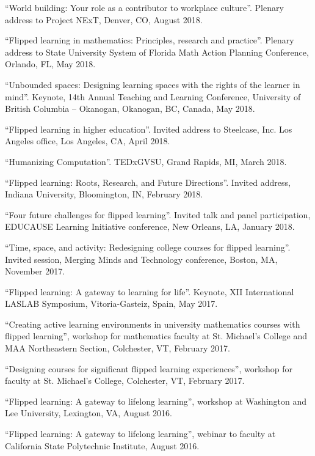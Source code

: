 \documentclass[letterpaper]{article}
\renewenvironment{itemize}{
  \begin{list}{}{
    \setlength{\leftmargin}{1.5em}
	\setlength{\itemsep}{0in}
  }
}{
  \end{list}
}
\begin{document}
\begin{itemize}
   \item ``World building: Your role as a contributor to workplace culture''. Plenary address to Project NExT, Denver, CO, August 2018. 
   \item ``Flipped learning in mathematics: Principles, research and practice''. Plenary address to State University System of Florida Math Action Planning Conference, Orlando, FL, May 2018. 
   \item ``Unbounded spaces: Designing learning spaces with the rights of the learner in mind''. Keynote, 14th Annual Teaching and Learning Conference, University of British Columbia -- Okanogan, Okanogan, BC, Canada, May 2018. 
   \item ``Flipped learning in higher education''. Invited address to Steelcase, Inc. Los Angeles office, Los Angeles, CA, April 2018. 
   \item ``Humanizing Computation''. TEDxGVSU, Grand Rapids, MI, March 2018. 
   \item ``Flipped learning: Roots, Research, and Future Directions''. Invited address, Indiana University, Bloomington, IN, February 2018. 
   \item ``Four future challenges for flipped learning''. Invited talk and panel participation, EDUCAUSE Learning Initiative conference, New Orleans, LA, January 2018. 
   \item ``Time, space, and activity: Redesigning college courses for flipped learning''. Invited session, Merging Minds and Technology conference, Boston, MA, November 2017. 
   \item ``Flipped learning: A gateway to learning for life''. Keynote, XII International LASLAB Symposium, Vitoria-Gasteiz, Spain, May 2017. 
  \item ``Creating active learning environments in university mathematics courses with flipped learning'', workshop for mathematics faculty at St. Michael's College and MAA Northeastern Section, Colchester, VT, February 2017.
  \item ``Designing courses for significant flipped learning experiences'', workshop for faculty at St. Michael's College, Colchester, VT, February 2017.
  	\item ``Flipped learning: A gateway to lifelong learning'', workshop at Washington and Lee University, Lexington, VA, August 2016.
	\item ``Flipped learning: A gateway to lifelong learning'', webinar to faculty at California State Polytechnic Institute, August 2016.

\end{itemize}
\end{document}
